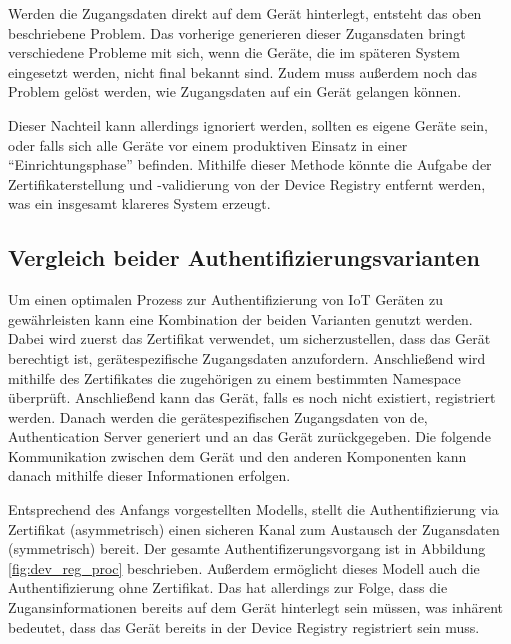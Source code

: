 Werden die Zugangsdaten direkt auf dem Gerät hinterlegt, entsteht das oben beschriebene Problem. Das vorherige generieren dieser Zugansdaten bringt verschiedene Probleme mit sich, wenn die Geräte, die im späteren System eingesetzt werden, nicht final bekannt sind. Zudem muss außerdem noch das Problem gelöst werden, wie Zugangsdaten auf ein Gerät gelangen können.

Dieser Nachteil kann allerdings ignoriert werden, sollten es eigene Geräte sein, oder falls sich alle Geräte vor einem produktiven Einsatz in einer \enquote{Einrichtungsphase} befinden. Mithilfe dieser Methode könnte die Aufgabe der Zertifikaterstellung und -validierung von der Device Registry entfernt werden, was ein insgesamt klareres System erzeugt.

\subsection{Vergleich beider Authentifizierungsvarianten}

Um einen optimalen Prozess zur Authentifizierung von IoT Geräten zu gewährleisten kann eine Kombination der beiden Varianten genutzt werden. Dabei wird zuerst das Zertifikat verwendet, um sicherzustellen, dass das Gerät berechtigt ist, gerätespezifische Zugangsdaten anzufordern. Anschließend wird mithilfe des Zertifikates die zugehörigen zu einem bestimmten Namespace überprüft. Anschließend kann das Gerät, falls es noch nicht existiert, registriert werden. Danach werden die gerätespezifischen Zugangsdaten von de, Authentication Server generiert und an das Gerät zurückgegeben. Die folgende Kommunikation zwischen dem Gerät und den anderen Komponenten kann danach mithilfe dieser Informationen erfolgen.

Entsprechend des Anfangs vorgestellten Modells, stellt die Authentifizierung via Zertifikat (asymmetrisch) einen sicheren Kanal zum Austausch der Zugansdaten (symmetrisch) bereit. Der gesamte Authentifizerungsvorgang ist in Abbildung \vref{fig:dev_reg_proc} beschrieben. Außerdem ermöglicht dieses Modell auch die Authentifizierung ohne Zertifikat. Das hat allerdings zur Folge, dass die Zugansinformationen bereits auf dem Gerät hinterlegt sein müssen, was inhärent bedeutet, dass das Gerät bereits in der Device Registry registriert sein muss.

